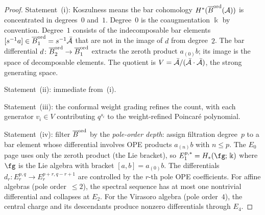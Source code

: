 \begin{proof}
Statement~(i): Koszulness means the bar cohomology
$H^*(\overline{B}^{\mathrm{ord}}(\mathcal{A}))$ is concentrated
in degrees~$0$ and~$1$. Degree~$0$ is the coaugmentation
$\Bbbk$ by convention. Degree~$1$ consists of the
indecomposable bar elements
$[s^{-1}a]\in\overline{B}^{\mathrm{ord}}_1=s^{-1}\bar{\mathcal{A}}$
that are not in the image of $d$ from degree~$2$. The bar
differential $d\colon\overline{B}^{\mathrm{ord}}_2\to
\overline{B}^{\mathrm{ord}}_1$ extracts the zeroth product
$a_{(0)}b$; its image is the space of decomposable
elements. The quotient is $V=\bar{\mathcal{A}}/(\bar{\mathcal{A}}\cdot\bar{\mathcal{A}})$,
the strong generating space.

Statement~(ii): immediate from~(i).

Statement~(iii): the conformal weight grading refines
the count, with each generator $v_i\in V$ contributing
$q^{s_i}$ to the weight-refined Poincar\'e polynomial.

Statement~(iv): filter $\overline{B}^{\mathrm{ord}}$ by
the \emph{pole-order depth}: assign filtration degree~$p$
to a bar element whose differential involves OPE products
$a_{(n)}b$ with $n\le p$. The $E_0$ page uses only the
zeroth product (the Lie bracket), so
$E_1^{p,*}=H_*(\fg;\,\Bbbk)$ where $\fg$ is the Lie algebra
with bracket $[a,b]=a_{(0)}b$. The differentials
$d_r\colon E_r^{p,q}\to E_r^{p+r,q-r+1}$ are controlled by
the $r$-th pole OPE coefficients. For affine algebras
(pole order~$\le 2$), the spectral sequence has at most one
nontrivial differential and collapses at $E_2$. For the
Virasoro algebra (pole order~$4$), the central charge and
its descendants produce nonzero differentials through
$E_4$.
\end{proof}

